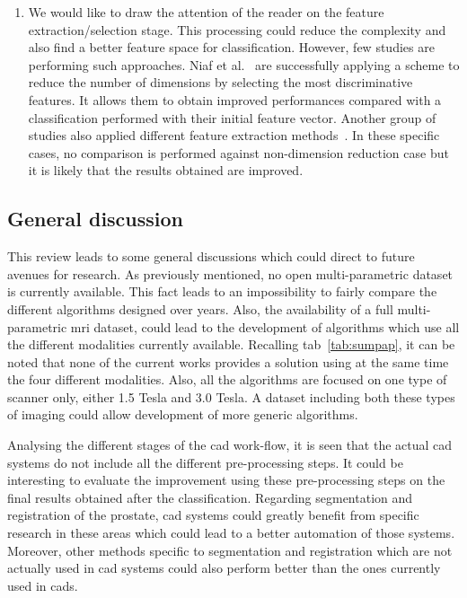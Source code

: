 \begin{enumerate}
\item We would like to draw the attention of the reader on the feature extraction/selection stage. This processing could reduce the complexity and also find a better feature space for classification. However, few studies are performing such approaches. Niaf et al.~\cite{Niaf2011,Niaf2012} are successfully applying a scheme to reduce the number of dimensions by selecting the most discriminative features. It allows them to obtain improved performances compared with a classification performed with their initial feature vector. Another group of studies also applied different feature extraction methods~\cite{Viswanath2008a,Viswanath2008,Viswanath2012,Tiwari2007,Tiwari2008,Tiwari2009,Tiwari2010,Tiwari2012,Tiwari2013}. In these specific cases, no comparison is performed against non-dimension reduction case but it is likely that the results obtained are improved.
\end{enumerate}

\subsection{General discussion}

This review leads to some general discussions which could direct to future avenues for research. As previously mentioned, no open multi-parametric dataset is currently available. This fact leads to an impossibility to fairly compare the different algorithms designed over years. Also, the availability of a full multi-parametric \ac{mri} dataset, could lead to the development of algorithms which use all the different modalities currently available. Recalling \ac{tab}~\ref{tab:sumpap}, it can be noted that none of the current works provides a solution using at the same time the four different modalities. Also, all the algorithms are focused on one type of scanner only, either 1.5 Tesla and 3.0 Tesla. A dataset including both these types of imaging could allow development of more generic algorithms.

Analysing the different stages of the \ac{cad} work-flow, it is seen that the actual \ac{cad} systems do not include all the different pre-processing steps. It could be interesting to evaluate the improvement using these pre-processing steps on the final results obtained after the classification. Regarding segmentation and registration of the prostate, \ac{cad} systems could greatly benefit from specific research in these areas which could lead to a better automation of those systems. Moreover, other methods specific to segmentation and registration which are not actually used in \ac{cad} systems could also perform better than the ones currently used in \acp{cad}.

